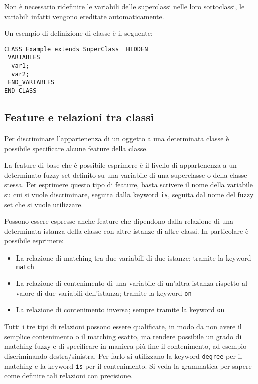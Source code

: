 Non è necessario ridefinire le variabili delle superclassi nelle loro sottoclassi, le variabili infatti vengono ereditate automaticamente.

Un esempio di definizione di classe è il seguente:

\begin{verbatim}
CLASS Example extends SuperClass  HIDDEN
 VARIABLES
  var1;
  var2;
 END_VARIABLES
END_CLASS
\end{verbatim}


\subsection{Feature e relazioni tra classi}

Per discriminare l'appartenenza di un oggetto a una determinata classe è possibile specificare alcune feature della classe.

La feature di base che è possibile esprimere è il livello di appartenenza a un determinato fuzzy set definito su una variabile di una superclasse o della classe stessa. 
Per esprimere questo tipo di feature, basta scrivere il nome della variabile su cui si vuole discriminare, seguita dalla keyword \verb|is|, seguita dal nome del fuzzy set che si vuole utilizzare.

Possono essere espresse anche feature che dipendono dalla relazione di una determinata istanza della classe con altre istanze di altre classi.
In particolare è possibile esprimere:

\begin{itemize}
 \item La relazione di matching tra due variabili di due istanze; tramite la keyword \verb|match|
 \item La relazione di contenimento di una variabile di un'altra istanza rispetto al valore di due variabili dell'istanza; tramite la keyword \verb|on|
 \item La relazione di contenimento inversa; sempre tramite la keyword \verb|on|
\end{itemize}

Tutti i tre tipi di relazioni possono essere qualificate, in modo da non avere il semplice contenimento o il matching esatto, ma rendere possibile un grado di matching fuzzy e di specificare in maniera più fine il contenimento, ad esempio discriminando destra/sinistra. Per farlo si utilizzano la keyword \verb|degree| per il matching e la keyword \verb|is| per il contenimento. Si veda la grammatica per sapere come definire tali relazioni con precisione.

